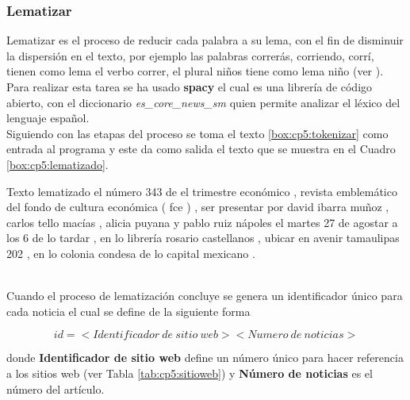 \subsubsection{Lematizar}
Lematizar es el proceso de reducir cada palabra a su lema, con el fin de disminuir la dispersión en el texto, por ejemplo las palabras correrás, corriendo, corrí, tienen como lema el verbo correr, el plural niños tiene como lema niño (ver ). Para realizar esta tarea se ha usado \textbf{spacy} el cual es una librería de código abierto, con el diccionario \textit{es\_core\_news\_sm} quien permite analizar el léxico del lenguaje español.\\

Siguiendo con las etapas del proceso se toma el texto \ref{box:cp5:tokenizar} como entrada al programa y este da como salida el texto que se muestra en el Cuadro \ref{box:cp5:lematizado}.\\

\begin{mygraybox}[label={box:cp5:lematizado}]{Texto lematizado} 
el número 343 de el trimestre económico , revista emblemático del fondo de cultura económica ( fce ) , ser presentar por david ibarra muñoz , carlos tello macías , alicia puyana y pablo ruiz nápoles el martes 27 de agostar a los 6 de lo tardar , en lo librería rosario castellanos , ubicar en avenir tamaulipas 202 , en lo colonia condesa de lo capital mexicano .
\end{mygraybox}
\ \\

Cuando el proceso de lematización concluye se genera un identificador único para cada noticia el cual se define de la siguiente forma 

\begin{equation*}
id=<Identificador\ de\ sitio\ web><Numero\ de\ noticias>
\end{equation*}
 
donde \textbf{Identificador de sitio web} define un número único para hacer referencia a los sitios web (ver Tabla \ref{tab:cp5:sitioweb}) y  \textbf{Número de noticias} es el número del artículo.

